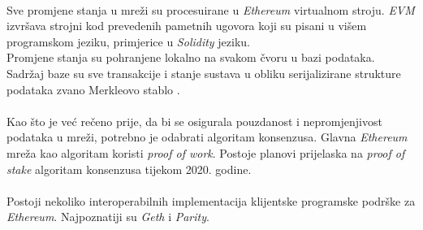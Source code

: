 \documentclass[times, utf8, zavrsni, numeric]{fer}
\begin{document}
\paragraph{}
Sve promjene stanja u mreži su procesuirane u \emph{Ethereum} virtualnom stroju. \emph{EVM} izvršava strojni kod prevedenih pametnih ugovora koji su pisani u višem
programskom jeziku, primjerice u \emph{Solidity} jeziku. \\
Promjene stanja su pohranjene lokalno na svakom čvoru u bazi podataka. Sadržaj baze su sve transakcije i stanje sustava u obliku serijalizirane strukture podataka zvano
Merkleovo stablo .
\paragraph{}
Kao što je već rečeno prije, da bi se osigurala pouzdanost i nepromjenjivost podataka u mreži, potrebno je odabrati algoritam konsenzusa. Glavna \emph{Ethereum} mreža
kao algoritam koristi \emph{proof of work}. Postoje planovi prijelaska na \emph{proof of stake} algoritam konsenzusa tijekom 2020. godine.
\paragraph{}
Postoji nekoliko interoperabilnih implementacija klijentske programske podrške za \emph{Ethereum}. Najpoznatiji su \emph{Geth} i \emph{Parity}.\citep{masteringEth}
\end{document}

